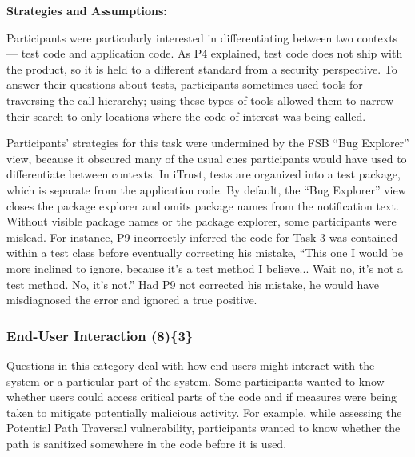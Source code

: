 \documentclass[10pt,journal,compsoc]{IEEEtran}
\begin{document}
\textbf{Strategies and Assumptions:}

Participants were particularly interested in differentiating between two contexts --- test code and application code. 
As P4 explained, test code does not ship with the product, so it is held to a different standard from a security perspective. 
To answer their questions about tests, participants sometimes used tools for traversing the call hierarchy; using these types of tools allowed them to narrow their search to only locations where the code of interest was being called.


Participants' strategies for this task were undermined by the FSB ``Bug Explorer'' view, because it obscured many of the usual cues participants would have used to differentiate between contexts.
In iTrust, tests are organized into a test package, which is separate from the application code. 
By default, the ``Bug Explorer'' view closes the package explorer and omits package names from the notification text.
Without visible package names or the package explorer, some participants were mislead.
For instance, P9 incorrectly inferred the code for Task 3 was contained within a test class before eventually correcting his mistake, 
``This one I would be more inclined to ignore, because it's a test method I believe... Wait no, it's not a test method. No, it's not.''
Had P9 not corrected his mistake, he would have misdiagnosed the error and ignored a true positive.







\subsubsection{End-User Interaction (8)\{3\}}

\label{eui}

Questions in this category deal with how end users might interact with the system or a particular part of the system. 
Some participants wanted to know whether users could access critical parts of the code and if measures were being taken to mitigate potentially malicious activity. 
For example, while assessing the Potential Path Traversal vulnerability, participants wanted to know whether the path is sanitized somewhere in the code before it is used.
\\
\end{document}
